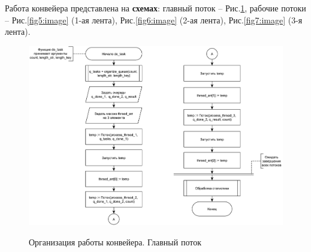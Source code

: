 Работа конвейера представлена на \textbf{схемах}: главный поток -- Рис.\ref{fig4:image}, рабочие потоки -- Рис.\ref{fig5:image} (1-ая лента), Рис.\ref{fig6:image} (2-ая лента), Рис.\ref{fig7:image} (3-я лента).\\
\begin{figure}[h]
	\begin{center}
		{\includegraphics[scale = 0.5]{schemes/conveyor}}
		\caption{Организация работы конвейера. Главный поток}
		\label{fig4:image}
	\end{center}
\end{figure}

\newpage

